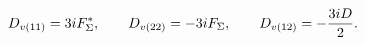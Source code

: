 \begin{equation}
D_{v(11)}=3i F_{\Sigma}^*, 
\qquad
D_{v(22)}=-3i F_{\Sigma}, 
\qquad
D_{v(12)}=-{3i D \over 2}
. 
\end{equation} 
